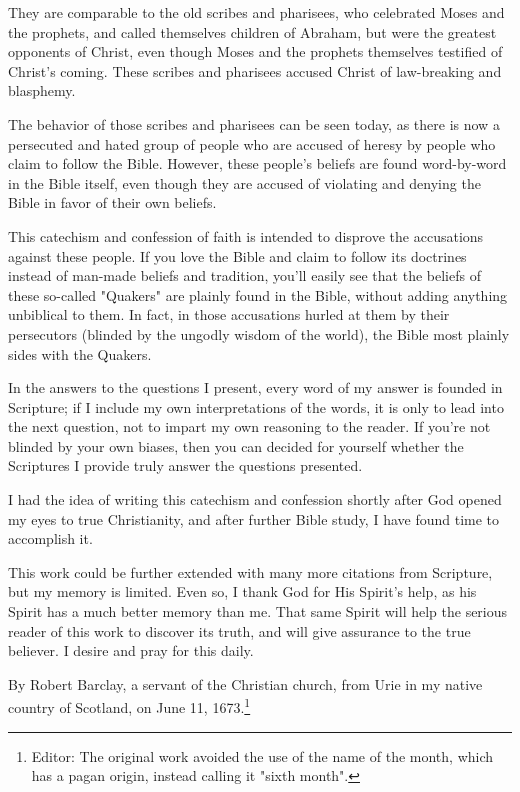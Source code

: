 \documentclass[chapterpreface_main.tex]{subfiles}
\begin{document}
	They are comparable to the old scribes and pharisees, who celebrated Moses and the prophets, and called themselves children of Abraham, but were the greatest opponents of Christ, even though Moses and the prophets themselves testified of Christ's coming. These scribes and pharisees accused Christ of law-breaking and blasphemy.
	
	The behavior of those scribes and pharisees can be seen today, as there is now a persecuted and hated group of people who are accused of heresy by people who claim to follow the Bible. However, these people's beliefs are found word-by-word in the Bible itself, even though they are accused of violating and denying the Bible in favor of their own beliefs.
	
	This catechism and confession of faith is intended to disprove the accusations against these people. If you love the Bible and claim to follow its doctrines instead of man-made beliefs and tradition, you'll easily see that the beliefs of these so-called "Quakers" are plainly found in the Bible, without adding anything unbiblical to them. In fact, in those accusations hurled at them by their persecutors (blinded by the ungodly wisdom of the world), the Bible most plainly sides with the Quakers.
	
	In the answers to the questions I present, every word of my answer is founded in Scripture; if I include my own interpretations of the words, it is only to lead into the next question, not to impart my own reasoning to the reader. If you're not blinded by your own biases, then you can decided for yourself whether the Scriptures I provide truly answer the questions presented.
	
	I had the idea of writing this catechism and confession shortly after God opened my eyes to true Christianity, and after further Bible study, I have found time to accomplish it.
	
	This work could be further extended with many more citations from Scripture, but my memory is limited. Even so, I thank God for His Spirit's help, as his Spirit has a much better memory than me. That same Spirit will help the serious reader of this work to discover its truth, and will give assurance to the true believer. I desire and pray for this daily.
	
	By Robert Barclay, a servant of the Christian church, from Urie in my native country of Scotland, on June 11, 1673.\footnote{Editor: The original work avoided the use of the name of the month, which has a pagan origin, instead calling it "sixth month".}
	
	
\end{document}
